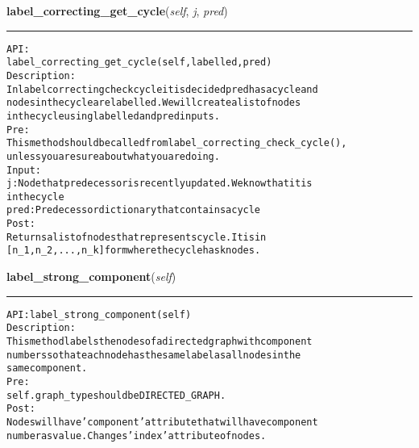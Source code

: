 \hspace{.8\funcindent}\begin{boxedminipage}{\funcwidth}

    \raggedright \textbf{label\_correcting\_get\_cycle}(\textit{self}, \textit{j}, \textit{pred})

    \vspace{-1.5ex}

    \rule{\textwidth}{0.5\fboxrule}
\setlength{\parskip}{2ex}
\begin{alltt}

API:
    label\_correcting\_get\_cycle(self, labelled, pred)
Description:
    In label correcting check cycle it is decided pred has a cycle and
    nodes in the cycle are labelled. We will create a list of nodes
    in the cycle using labelled and pred inputs.
Pre:
    This method should be called from label\_correcting\_check\_cycle(),
    unless you are sure about what you are doing.
Input:
    j: Node that predecessor is recently updated. We know that it is
    in the cycle
    pred: Predecessor dictionary that contains a cycle
Post:
    Returns a list of nodes that represents cycle. It is in
    [n\_1, n\_2, ..., n\_k] form where the cycle has k nodes.
\end{alltt}

\setlength{\parskip}{1ex}
    \end{boxedminipage}

    \label{coinor:gimpy:graph:Graph:label_strong_component}

    \vspace{0.5ex}

\hspace{.8\funcindent}\begin{boxedminipage}{\funcwidth}

    \raggedright \textbf{label\_strong\_component}(\textit{self})

    \vspace{-1.5ex}

    \rule{\textwidth}{0.5\fboxrule}
\setlength{\parskip}{2ex}
\begin{alltt}

API: label\_strong\_component(self)
Description:
This method labels the nodes of a directed graph with component
numbers so that each node has the same label as all nodes in the
same component.
Pre:
    self.graph\_type should be DIRECTED\_GRAPH.
Post:
    Nodes will have 'component' attribute that will have component
    number as value. Changes 'index' attribute of nodes.
\end{alltt}

\setlength{\parskip}{1ex}
    \end{boxedminipage}

